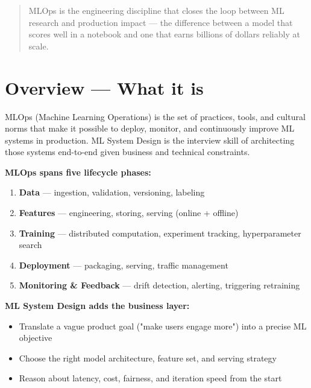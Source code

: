 \documentclass[11pt]{article}
\providecommand{\tightlist}{\setlength{\itemsep}{1pt}\setlength{\parskip}{0pt}}
\begin{document}
\makecoverpage

\thispagestyle{empty}
{\hypersetup{hidelinks}\tableofcontents}
\clearpage

\begin{quote}
MLOps is the engineering discipline that closes the loop between ML research and production impact --- the difference between a model that scores well in a notebook and one that earns billions of dollars reliably at scale.
\end{quote}

\section{Overview --- What it is}\label{overview--what-it-is}

MLOps (Machine Learning Operations) is the set of practices, tools, and cultural norms that make it possible to deploy, monitor, and continuously improve ML systems in production. ML System Design is the interview skill of architecting those systems end-to-end given business and technical constraints.

\textbf{MLOps spans five lifecycle phases:}


\begin{enumerate}
\def\labelenumi{\arabic{enumi}.}
\tightlist
\item
  \textbf{Data} --- ingestion, validation, versioning, labeling
\item
  \textbf{Features} --- engineering, storing, serving (online + offline)
\item
  \textbf{Training} --- distributed computation, experiment tracking, hyperparameter search
\item
  \textbf{Deployment} --- packaging, serving, traffic management
\item
  \textbf{Monitoring \& Feedback} --- drift detection, alerting, triggering retraining
\end{enumerate}

\textbf{ML System Design adds the business layer:}

\begin{itemize}
\tightlist
\item
  Translate a vague product goal ("make users engage more") into a precise ML objective
\item
  Choose the right model architecture, feature set, and serving strategy
\item
  Reason about latency, cost, fairness, and iteration speed from the start
\end{itemize}
\end{document}
